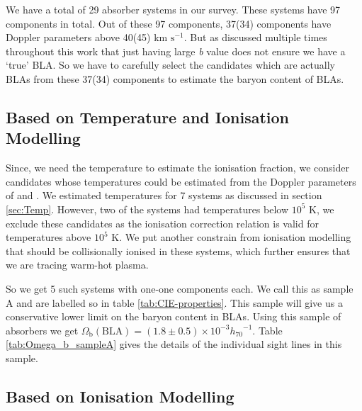 We have a total of 29 absorber systems in our survey. These systems have 97  components in total. Out of these 97 components, 37(34) components have Doppler parameters above 40(45) km $\text{s}^{-1}$. But as discussed multiple times throughout this work that just having large \emph{b} value does not ensure we have a `true' BLA. So we have to carefully select the candidates which are actually BLAs from these 37(34) components to estimate the baryon content of BLAs. 

\subsection{Based on Temperature and Ionisation Modelling}  \label{sec:sampleA}

Since, we need the temperature to estimate the ionisation fraction, we consider candidates whose temperatures could be estimated from the Doppler parameters of  and . We estimated temperatures for 7 systems as discussed in section \ref{sec:Temp}. However, two of the systems had temperatures below $10^5$ K, we exclude these candidates as the ionisation correction relation is valid for temperatures above $10^5$ K. We put another constrain from ionisation modelling that  should be collisionally ionised in these systems, which further ensures that we are tracing warm-hot plasma. 

So we get 5 such systems with one-one components each. We call this as sample A and are labelled so in table \ref{tab:CIE-properties}. This sample will give us a conservative lower limit on the baryon content in BLAs. Using this sample of absorbers we get $\Omega_\text{b}(\text{BLA})=(1.8 \pm 0.5)\times 10^{-3} {h_{70}}^{-1}$. Table \ref{tab:Omega_b_sampleA} gives the details of the individual sight lines in this sample.  


\subsection{Based on Ionisation Modelling} \label{sec:sampleB}

